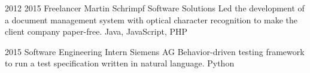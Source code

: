 {\block%
{%
2012 %
}{%
2015%
}{%
Freelancer
}{%
Martin Schrimpf Software Solutions
}{%
Led the development of a document %
management system with optical character recognition to make the client company paper-free.
}{%
Java, JavaScript, PHP
}

\block%
{%
2015%
}{%
}{%
Software Engineering Intern
}{%
Siemens AG
}{%
Behavior-driven testing framework to run a test specification written in natural language.%
}{%
Python
}

}


\newcommand{\publications}{%

\publication{2019}{KubiliusSchrimpf2019}

\publication{2018}{bashivan2018continual}

\publication{2018}{arend2018single}

\publication{2018}{schrimpf2018b}

\publication{2018}{schrimpf2018}

\publication{2018}{TangSchrimpfLotter2018}

\publication{2017}{cheney2017robustness}

\publication{2016}{schrimpf2016}

}


